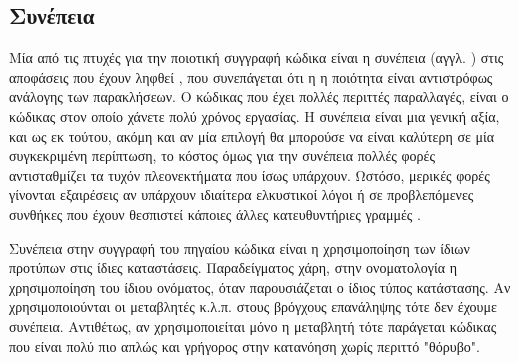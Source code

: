 

\subsection{Συνέπεια} 

Μία από τις πτυχές για την ποιοτική συγγραφή κώδικα είναι η συνέπεια (αγγλ. ) στις αποφάσεις που έχουν ληφθεί , που συνεπάγεται ότι η η ποιότητα είναι αντιστρόφως ανάλογης των παρακλήσεων. Ο κώδικας που έχει πολλές περιττές παραλλαγές, είναι ο κώδικας στον οποίο χάνετε πολύ χρόνος εργασίας. Η συνέπεια είναι μια γενική αξία, και ως εκ τούτου, ακόμη και αν μία επιλογή θα μπορούσε να είναι καλύτερη σε μία συγκεκριμένη περίπτωση, το κόστος όμως για την συνέπεια πολλές φορές αντισταθμίζει τα τυχόν πλεονεκτήματα που ίσως υπάρχουν. Ωστόσο, μερικές φορές γίνονται εξαιρέσεις αν υπάρχουν ιδιαίτερα ελκυστικοί λόγοι ή σε προβλεπόμενες συνθήκες που έχουν θεσπιστεί κάποιες άλλες κατευθυντήριες γραμμές \cite{wiki:Programming_style}.

Συνέπεια στην συγγραφή του πηγαίου κώδικα είναι η χρησιμοποίηση των ίδιων προτύπων στις ίδιες καταστάσεις. Παραδείγματος χάρη, στην ονοματολογία η χρησιμοποίηση του ίδιου ονόματος, όταν παρουσιάζεται ο ίδιος τύπος κατάστασης. Αν χρησιμοποιούνται οι μεταβλητές  κ.λ.π. στους βρόγχους επανάληψης τότε δεν έχουμε συνέπεια. Αντιθέτως, αν χρησιμοποιείται μόνο η μεταβλητή  τότε παράγεται κώδικας που είναι πολύ πιο απλώς και γρήγορος στην κατανόηση χωρίς περιττό "θόρυβο".\cite{wikibook:cpp_style}


